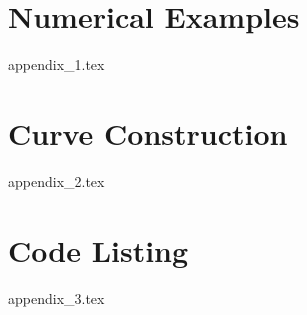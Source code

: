 \documentclass[11pt,a4paper,oneside]{book}
\theoremstyle{plain}
\theoremstyle{definition}
\theoremstyle{remark}
\begin{document}




\appendix
\chapter{Numerical Examples}
{appendix_1.tex}

\chapter{Curve Construction}
{appendix_2.tex}

\chapter{Code Listing}
{appendix_3.tex}

\end{document}
